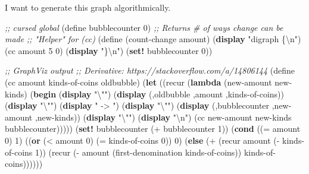 \documentclass[
]{article}
\newenvironment{Shaded}{}{}
\newcommand{\CharTok}[1]{\textcolor[rgb]{0.25,0.44,0.63}{#1}}
\newcommand{\CommentTok}[1]{\textcolor[rgb]{0.38,0.63,0.69}{\textit{#1}}}
\newcommand{\DecValTok}[1]{\textcolor[rgb]{0.25,0.63,0.44}{#1}}
\newcommand{\ExtensionTok}[1]{#1}
\newcommand{\FunctionTok}[1]{\textcolor[rgb]{0.02,0.16,0.49}{#1}}
\newcommand{\KeywordTok}[1]{\textcolor[rgb]{0.00,0.44,0.13}{\textbf{#1}}}
\newcommand{\NormalTok}[1]{#1}
\newcommand{\OperatorTok}[1]{\textcolor[rgb]{0.40,0.40,0.40}{#1}}
\newcommand{\StringTok}[1]{\textcolor[rgb]{0.25,0.44,0.63}{#1}}
\begin{document}
I want to generate this graph algorithmically.

\hypertarget{count-change-graphviz}{%
\label{count-change-graphviz}}%
\begin{Shaded}
\begin{Highlighting}[numbers=left,,]
\CommentTok{;; cursed global}
\NormalTok{(}\ExtensionTok{define}\FunctionTok{ bubblecounter }\DecValTok{0}\NormalTok{)}
\CommentTok{;; Returns \# of ways change can be made}
\CommentTok{;; "Helper" for (cc)}
\NormalTok{(}\ExtensionTok{define}\FunctionTok{ }\NormalTok{(count{-}change amount)}
\NormalTok{  (}\KeywordTok{display} \StringTok{"digraph \{}\CharTok{\textbackslash{}n}\StringTok{"}\NormalTok{)}
\NormalTok{  (cc amount }\DecValTok{5} \DecValTok{0}\NormalTok{)}
\NormalTok{  (}\KeywordTok{display} \StringTok{"\}}\CharTok{\textbackslash{}n}\StringTok{"}\NormalTok{)}
\NormalTok{  (}\KeywordTok{set!}\NormalTok{ bubblecounter }\DecValTok{0}\NormalTok{))}

\CommentTok{;; GraphViz output}
\CommentTok{;; Derivative: https://stackoverflow.com/a/14806144}
\NormalTok{(}\ExtensionTok{define}\FunctionTok{ }\NormalTok{(cc amount kinds{-}of{-}coins oldbubble)}
\NormalTok{  (}\KeywordTok{let}\NormalTok{ ((recur (}\KeywordTok{lambda}\NormalTok{ (new{-}amount new{-}kinds)}
\NormalTok{                 (}\KeywordTok{begin}
\NormalTok{                   (}\KeywordTok{display} \StringTok{"}\CharTok{\textbackslash{}"}\StringTok{"}\NormalTok{)}
\NormalTok{                   (}\KeywordTok{display}\NormalTok{ \textasciigrave{}(,oldbubble ,amount ,kinds{-}of{-}coins))}
\NormalTok{                   (}\KeywordTok{display} \StringTok{"}\CharTok{\textbackslash{}"}\StringTok{"}\NormalTok{)}
\NormalTok{                   (}\KeywordTok{display} \StringTok{" {-}\textgreater{} "}\NormalTok{)}
\NormalTok{                   (}\KeywordTok{display} \StringTok{"}\CharTok{\textbackslash{}"}\StringTok{"}\NormalTok{)}
\NormalTok{                   (}\KeywordTok{display}\NormalTok{ \textasciigrave{}(,bubblecounter ,new{-}amount ,new{-}kinds))}
\NormalTok{                   (}\KeywordTok{display} \StringTok{"}\CharTok{\textbackslash{}"}\StringTok{"}\NormalTok{)}
\NormalTok{                   (}\KeywordTok{display} \StringTok{"}\CharTok{\textbackslash{}n}\StringTok{"}\NormalTok{)}
\NormalTok{                   (cc new{-}amount new{-}kinds bubblecounter)))))}
\NormalTok{    (}\KeywordTok{set!}\NormalTok{ bubblecounter (}\OperatorTok{+}\NormalTok{ bubblecounter }\DecValTok{1}\NormalTok{))}
\NormalTok{    (}\KeywordTok{cond}\NormalTok{ ((}\OperatorTok{=}\NormalTok{ amount }\DecValTok{0}\NormalTok{) }\DecValTok{1}\NormalTok{)}
\NormalTok{          ((}\KeywordTok{or}\NormalTok{ (}\OperatorTok{\textless{}}\NormalTok{ amount }\DecValTok{0}\NormalTok{) (}\OperatorTok{=}\NormalTok{ kinds{-}of{-}coins }\DecValTok{0}\NormalTok{)) }\DecValTok{0}\NormalTok{)}
\NormalTok{          (}\KeywordTok{else}\NormalTok{ (}\OperatorTok{+}
\NormalTok{                 (recur amount (}\OperatorTok{{-}}\NormalTok{ kinds{-}of{-}coins }\DecValTok{1}\NormalTok{))}
\NormalTok{                 (recur (}\OperatorTok{{-}}\NormalTok{ amount}
\NormalTok{                           (first{-}denomination kinds{-}of{-}coins))}
\NormalTok{                        kinds{-}of{-}coins))))))}


\end{Highlighting}
\end{Shaded}
\end{document}
